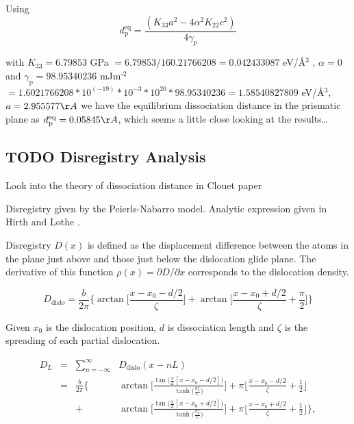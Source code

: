 \documentclass[11pt]{article}
\begin{document}
 Using 
\[
    d_{\text{p}}^{\text{eq}} = \frac{ ( K_{33}a^2 - 4 \alpha^2 K_{22} c^2 ) }{ 4 \gamma_{p} }
    \]

with \(K_{33} = 6.79853\) GPa \(= 6.79853 / 160.21766208 = 0.042433087\)
eV/\AA{}\(^{\text{3}}\) , \(\alpha = 0\) and \(\gamma_{\text{p}} = 98.95340236\) mJm\(^{\text{-2}}\) \(=
    1.6021766208*10^(-19) * 10^{-3} * 10^20 * 98.95340236 = 1.58540827809\)
eV/\AA{}\(^{\text{3}}\), \(a = 2.955577 \AA\) we have the equilibrium dissociation
distance in the prismatic plane as \(d_{\text{p}}^{\text{eq}} = 0.05845
    \AA\), which seems a little close looking at the results\ldots{} 

\subsection{{\bfseries\sffamily TODO} Disregistry Analysis}
\label{sec:org9fc894c}
Look into the theory of dissociation distance in Clouet paper
\cite{Clouet2012}


Disregistry given by the Peierls-Nabarro model. Analytic
expression given in Hirth and Lothe \cite{anderson2017theory}.

Disregistry \(D(x)\) is defined as the displacement difference
between the atoms in the plane just above and those just below the
dislocation glide plane. The derivative of this function \(\rho(x) = \partial
    D / \partial x\) corresponds to the dislocation density.


\[
    D_{\text{dislo}} = \frac{b}{2\pi} 
    \Bigg\{ \arctan \bigg[  \frac{x - x_0 - d/2}{ \zeta } \bigg] +
           \arctan \bigg[  \frac{x - x_0 + d/2}{ \zeta } + \frac{\pi}{2} \bigg]
	   \Bigg\}
    \]

Given \(x_0\) is the dislocation position, \(d\) is dissociation
length and \(\zeta\) is the spreading of each partial dislocation. 

\begin{align*}
  D_{L} &= &\sum_{n = -\infty}^{\infty}  &D_{\text{dislo}} (x - nL) \\
     &= &\frac{ b }{ 2\pi } 
        \Bigg \{ 
         &\arctan \bigg[ 
            \frac{ 
                  \tan \big( \frac{\pi}{L} [x - x_0 - d/2] \big)
                 }{ 
                 \tanh \big( \frac{\pi\zeta}{L} \big)
                  } \bigg]
       + \pi\bigg\lfloor 
       	 \frac{x - x_0 - d/2}{ \zeta } + \frac{1}{2}
       \bigg\rfloor \\
   & &+
         &\arctan \bigg[ 
            \frac{ 
                  \tan \big( \frac{\pi}{L} [x - x_0 + d/2] \big)
                 }{ 
                 \tanh \big( \frac{\pi\zeta}{L} \big)
                  } \bigg]
       + \pi \bigg\lfloor 
       	 \frac{x - x_0 + d/2}{ \zeta } + \frac{1}{2}
       \bigg\rfloor    \Bigg\},
\end{align*}
\end{document}
